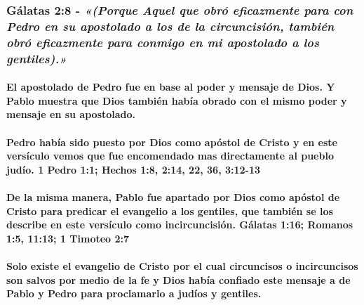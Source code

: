 \documentclass[11a pt,twoside]{article}
\newcommand{\scripture}[1]{%
  {\fontsize{12pt}{16pt}\selectfont\ScriptureFont\itshape #1}%
}
\let\oldsubsubsection\subsubsection
\renewcommand{\subsubsection}{\needspace{4\baselineskip}\oldsubsubsection}
\let\oldparagraph\paragraph
\renewcommand{\paragraph}{\needspace{3\baselineskip}\oldparagraph}
\begin{document}
\subsubsection{\texorpdfstring{Gálatas 2:8 -
\scripture{«(Porque Aquel que obró eficazmente para con Pedro en su apostolado a los de la circuncisión, también obró eficazmente para conmigo en mi apostolado a los gentiles).»}}{Gálatas 2:8 - }}\label{guxe1latas-28---porque-aquel-que-obruxf3-eficazmente-para-con-pedro-en-su-apostolado-a-los-de-la-circuncisiuxf3n-tambiuxe9n-obruxf3-eficazmente-para-conmigo-en-mi-apostolado-a-los-gentiles.}

\paragraph{El apostolado de Pedro fue en base al poder y mensaje de
Dios. Y Pablo muestra que Dios también había obrado con el mismo poder y
mensaje en su
apostolado.}\label{el-apostolado-de-pedro-fue-en-base-al-poder-y-mensaje-de-dios.-y-pablo-muestra-que-dios-tambiuxe9n-habuxeda-obrado-con-el-mismo-poder-y-mensaje-en-su-apostolado.}

\paragraph{Pedro había sido puesto por Dios como apóstol de Cristo y en
este versículo vemos que fue encomendado mas directamente al pueblo
judío. 1 Pedro 1:1; Hechos 1:8, 2:14, 22, 36,
3:12-13}\label{pedro-habuxeda-sido-puesto-por-dios-como-apuxf3stol-de-cristo-y-en-este-versuxedculo-vemos-que-fue-encomendado-mas-directamente-al-pueblo-juduxedo.-1-pedro-11-hechos-18-214-22-36-312-13}

\paragraph{De la misma manera, Pablo fue apartado por Dios como apóstol
de Cristo para predicar el evangelio a los gentiles, que también se los
describe en este versículo como incircuncisión. Gálatas 1:16; Romanos
1:5, 11:13; 1 Timoteo
2:7}\label{de-la-misma-manera-pablo-fue-apartado-por-dios-como-apuxf3stol-de-cristo-para-predicar-el-evangelio-a-los-gentiles-que-tambiuxe9n-se-los-describe-en-este-versuxedculo-como-incircuncisiuxf3n.-guxe1latas-116-romanos-15-1113-1-timoteo-27}

\paragraph{Solo existe el evangelio de Cristo por el cual circuncisos o
incircuncisos son salvos por medio de la fe y Dios había confiado este
mensaje a de Pablo y Pedro para proclamarlo a judíos y
gentiles.}\label{solo-existe-el-evangelio-de-cristo-por-el-cual-circuncisos-o-incircuncisos-son-salvos-por-medio-de-la-fe-y-dios-habuxeda-confiado-este-mensaje-a-de-pablo-y-pedro-para-proclamarlo-a-juduxedos-y-gentiles.}
\end{document}
